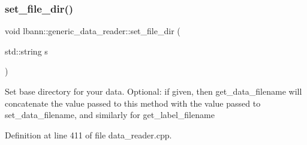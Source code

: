 \subsubsection{\texorpdfstring{set\+\_\+file\+\_\+dir()}{set\_file\_dir()}}
{\footnotesize\ttfamily void lbann\+::generic\+\_\+data\+\_\+reader\+::set\+\_\+file\+\_\+dir (\begin{DoxyParamCaption}\item[{std\+::string}]{s }\end{DoxyParamCaption})}

Set base directory for your data. Optional\+: if given, then get\+\_\+data\+\_\+filename will concatenate the value passed to this method with the value passed to set\+\_\+data\+\_\+filename, and similarly for get\+\_\+label\+\_\+filename 

Definition at line 411 of file data\+\_\+reader.\+cpp.


